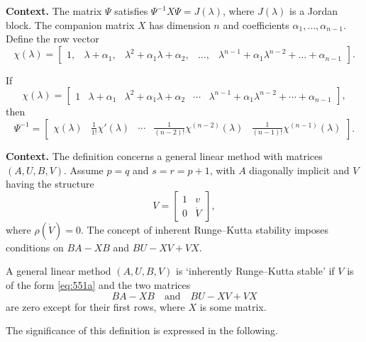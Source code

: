 \noindent\textbf{Context.}
The matrix $\Psi$ satisfies $\Psi^{-1}X\Psi = J(\lambda)$, where $J(\lambda)$ is a Jordan block. The companion matrix $X$ has dimension $n$ and coefficients $\alpha_1,\dots,\alpha_{n-1}$. Define the row vector
\[
\chi(\lambda)=\begin{bmatrix}
1, & \lambda+\alpha_1, & \lambda^2+\alpha_1\lambda+\alpha_2, & \dots, & \lambda^{n-1}+\alpha_1\lambda^{n-2}+\dots+\alpha_{n-1}
\end{bmatrix}.
\]

\begin{corollary}

  \label{cor:550C}
  \uses{}
If
\[
\chi(\lambda) = \begin{bmatrix}
1 & \lambda + \alpha_1 & \lambda^2 + \alpha_1 \lambda + \alpha_2 & \cdots & \lambda^{n-1} + \alpha_1 \lambda^{n-2} + \cdots + \alpha_{n-1}
\end{bmatrix},
\]
then
\[
\Psi^{-1} = \begin{bmatrix}
\chi(\lambda) & \frac{1}{1!} \chi'(\lambda) & \cdots & \frac{1}{(n-2)!} \chi^{(n-2)}(\lambda) & \frac{1}{(n-1)!} \chi^{(n-1)}(\lambda)
\end{bmatrix}.
\]
\end{corollary}

\noindent\textbf{Context.}
The definition concerns a general linear method with matrices $(A, U, B, V)$. Assume $p = q$ and $s = r = p + 1$, with $A$ diagonally implicit and $V$ having the structure
\[
V = \begin{bmatrix} 1 & v \\ 0 & \dot{V} \end{bmatrix},
\]
where $\rho(\dot{V}) = 0$. The concept of inherent Runge--Kutta stability imposes conditions on $BA - XB$ and $BU - XV + VX$.

\begin{definition}

  \label{def:551A}
A general linear method $(A, U, B, V)$ is `inherently Runge--Kutta stable' if $V$ is of the form \eqref{eq:551a} and the two matrices
\[
BA - XB \quad \text{and} \quad BU - XV + VX
\]
are zero except for their first rows, where $X$ is some matrix.

The significance of this definition is expressed in the following.
\end{definition}

